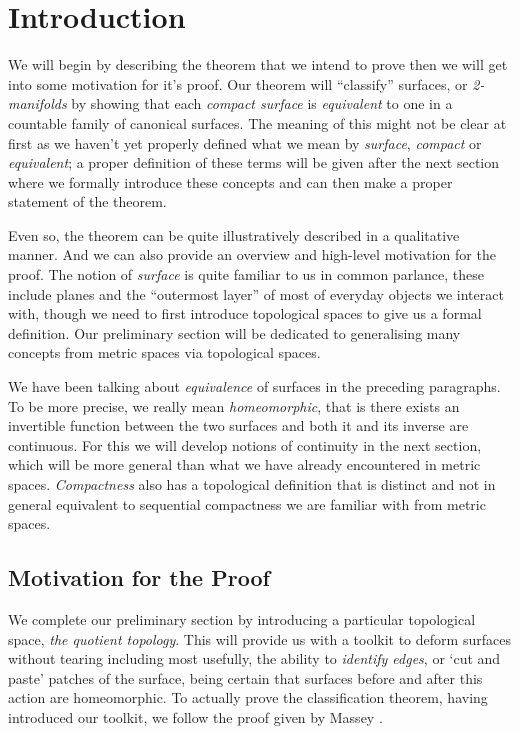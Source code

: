 \section{Introduction}
\label{sec:intro}

We will begin by describing the theorem that we intend to prove then
we will get into some motivation for it's proof. Our theorem will
``classify'' surfaces, or \emph{2-manifolds} by showing that each
\emph{compact surface} is \emph{equivalent} to one in a countable family of
canonical surfaces. The meaning of this might not be clear at
first as we haven't yet properly defined what we mean by
\emph{surface}, \emph{compact} or \emph{equivalent}; a proper
definition of these terms will be given after the next section where we
formally introduce these concepts and can then make a proper statement
of the theorem. 

Even so, the theorem can be quite illustratively described in a
qualitative manner. And we can also provide an overview and high-level
motivation for the proof. The notion of \emph{surface} is quite
familiar to us in common parlance, these include planes and the
``outermost layer'' of most of everyday objects we interact with,
though we need to first introduce topological spaces to give us a
formal definition. Our preliminary section will be dedicated to
generalising many concepts from metric spaces via topological spaces.

We have been talking about \emph{equivalence} of surfaces in the
preceding paragraphs. To be more precise, we really mean
\emph{homeomorphic}, that is there exists an invertible function
between the two surfaces and both it and its inverse are
continuous. For this we will develop notions of continuity in the next
section, which will be more general than what we have already
encountered in metric spaces. \emph{Compactness} also has a topological
definition that is distinct and not in general equivalent to sequential
compactness we are familiar with from metric spaces.

\subsection{Motivation for the Proof}
\label{sec:intro:motivation}

We complete our preliminary section by introducing a particular
topological space, \emph{the quotient topology}. This will provide us
with a toolkit to deform surfaces without tearing including most usefully, the
ability to \emph{identify edges}, or  `cut and paste' patches of the
surface, being certain that surfaces before and after this action are
homeomorphic. To actually prove the classification theorem, having introduced our toolkit, we follow the proof given by Massey \cite{mass}.

